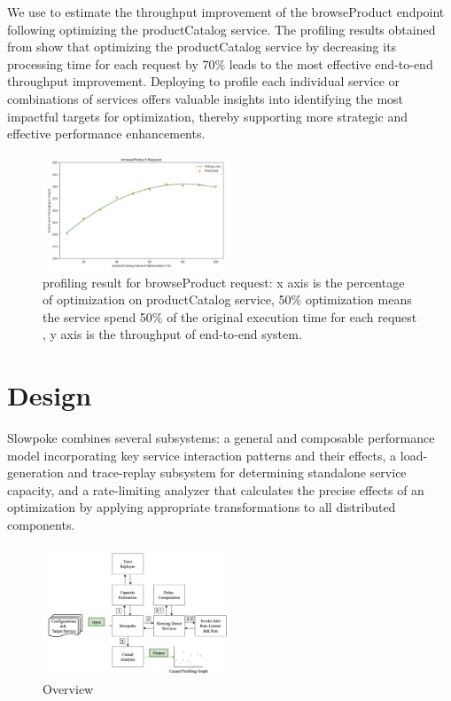 We use \ours to estimate the throughput improvement of the browseProduct endpoint following optimizing the productCatalog service. 
The profiling results obtained from \ours show that optimizing the productCatalog service by decreasing its processing time for each request by 70\% 
leads to the most effective end-to-end throughput improvement. 
Deploying \ours to profile each individual service or combinations of services offers valuable insights into identifying the most 
impactful targets for optimization, thereby supporting more strategic and effective performance enhancements.
\begin{figure}[h]
    \centering
    \includegraphics[width=0.5\textwidth]{img/example-output}
    \caption{\ours profiling result for browseProduct request: x axis is the percentage of optimization 
    on productCatalog service, 50\% optimization means the service spend 50\% of the original execution time for each request
    , y axis is the throughput of end-to-end system.}
    \label{fig:example}
\end{figure}


\section{\ours Design}

Slowpoke combines several subsystems: a general and composable performance model incorporating key service interaction 
patterns and their effects, a load-generation and trace-replay subsystem for determining standalone service capacity, 
and a rate-limiting analyzer that calculates the precise effects of an optimization by applying appropriate transformations 
to all distributed components. 

\begin{figure}[h]
    \centering
    \includegraphics[width=0.5\textwidth]{img/system-overview}
    \caption{\ours Overview }
    \label{fig:example}
\end{figure}

